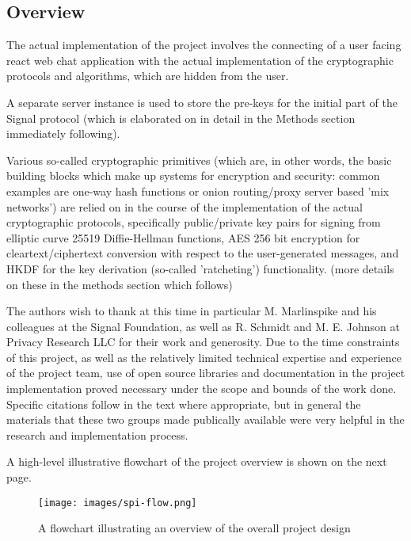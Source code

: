 \documentclass[12pt]{article}
\begin{document}
\subsection{Overview}
The actual implementation of the project involves the connecting of a user facing react web chat application with the actual implementation of the cryptographic protocols and algorithms, which are hidden from the user.
\par A separate server instance is used to store the pre-keys for the initial part of the Signal protocol (which is elaborated on in detail in the Methods section immediately following). 
\par Various so-called cryptographic primitives (which are, in other words, the basic building blocks which make up systems for encryption and security: common examples are one-way hash functions or onion routing/proxy server based 'mix networks') are relied on in the course of the implementation of the actual cryptographic protocols, specifically public/private key pairs for signing from elliptic curve 25519 Diffie-Hellman functions, AES 256 bit encryption for cleartext/ciphertext conversion with respect to the user-generated messages, and HKDF for the key derivation (so-called 'ratcheting') functionality. (more details on these in the methods section which follows)
\par The authors wish to thank at this time in particular M. Marlinspike and his colleagues at the Signal Foundation\parencite{website:sigfound}, as well as R. Schmidt and M. E. Johnson at Privacy Research LLC \parencite{website:prllc} for their work and generosity. Due to the time constraints of this project, as well as the relatively limited technical expertise and experience of the project team, use of open source libraries and documentation in the project implementation proved necessary under the scope and bounds of the work done. Specific citations follow in the text where appropriate, but in general the materials that these two groups made publically available were very helpful in the research and implementation process. \parencite{website:signal-docs}\parencite{website:prggh}\parencite{website:siglibjavascript}\parencite{website:prglibsigtypescript}\parencite{website:prglibsigdemo}
\par A high-level illustrative flowchart of the project overview is shown on the next page.

\begin{figure}[h!]
    \centering
    \texttt{[image: images/spi-flow.png]}
    \caption{A flowchart illustrating an overview of the overall project design}
    \label{fig:my_label5}
\end{figure}
\end{document}
